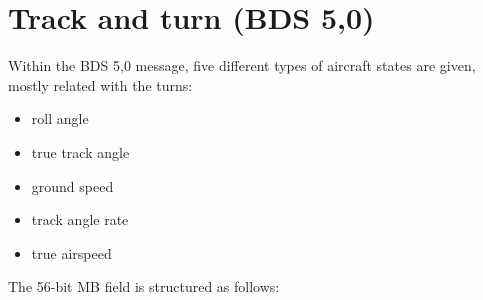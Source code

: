 \section{Track and turn (BDS 5,0)}\label{track-and-turn-bds-50}

Within the BDS 5,0 message, five different types of aircraft states are
given, mostly related with the turns:

\begin{itemize}
\item
  roll angle
\item
  true track angle
\item
  ground speed
\item
  track angle rate
\item
  true airspeed
\end{itemize}

The 56-bit MB field is structured as follows:

